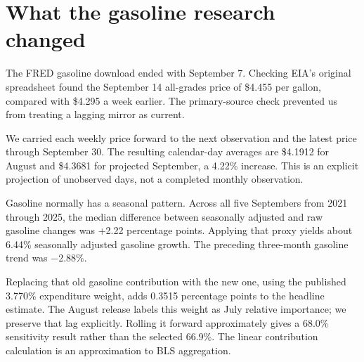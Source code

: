 \documentclass[11pt]{article}
\begin{document}
\section*{\textcolor{epdarkgreen}{What the gasoline research changed}}
The FRED gasoline download ended with September 7. Checking EIA’s original spreadsheet found the September 14 all-grades price of \$4.455 per gallon, compared with \$4.295 a week earlier. The primary-source check prevented us from treating a lagging mirror as current.


We carried each weekly price forward to the next observation and the latest price through September 30. The resulting calendar-day averages are \$4.1912 for August and \$4.3681 for projected September, a 4.22\% increase. This is an explicit projection of unobserved days, not a completed monthly observation.


Gasoline normally has a seasonal pattern. Across all five Septembers from 2021 through 2025, the median difference between seasonally adjusted and raw gasoline changes was +2.22 percentage points. Applying that proxy yields about 6.44\% seasonally adjusted gasoline growth. The preceding three-month gasoline trend was −2.88\%.


Replacing that old gasoline contribution with the new one, using the published 3.770\% expenditure weight, adds 0.3515 percentage points to the headline estimate. The August release labels this weight as July relative importance; we preserve that lag explicitly. Rolling it forward approximately gives a 68.0\% sensitivity result rather than the selected 66.9\%. The linear contribution calculation is an approximation to BLS aggregation.
\end{document}
